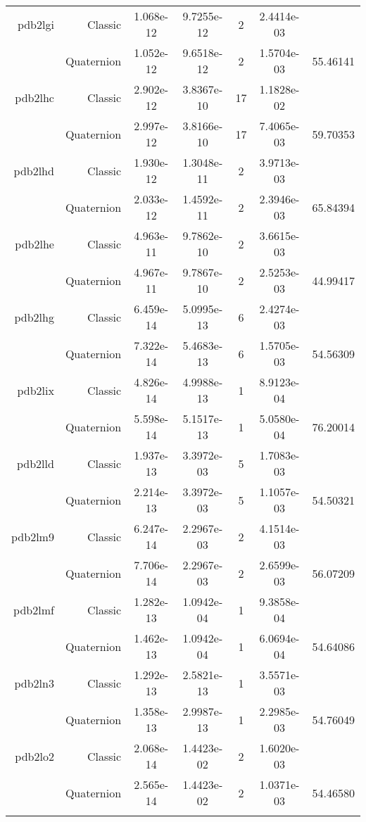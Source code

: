 \begin{xltabular}{\textwidth}{r|rS[table-format=1.3e+2]S[table-format=1.4e+2]cS[table-format=1.4e+2]S[table-format=-1.5]}
pdb2lgi & Classic & 1.068e-12 & 9.7255e-12 & 2 & 2.4414e-03 & \\
& Quaternion & 1.052e-12 & 9.6518e-12 & 2 & 1.5704e-03 & 55.46141\\  \addlinespace
pdb2lhc & Classic & 2.902e-12 & 3.8367e-10 & 17 & 1.1828e-02 & \\
& Quaternion & 2.997e-12 & 3.8166e-10 & 17 & 7.4065e-03 & 59.70353\\  \addlinespace
pdb2lhd & Classic & 1.930e-12 & 1.3048e-11 & 2 & 3.9713e-03 & \\
& Quaternion & 2.033e-12 & 1.4592e-11 & 2 & 2.3946e-03 & 65.84394\\  \addlinespace
pdb2lhe & Classic & 4.963e-11 & 9.7862e-10 & 2 & 3.6615e-03 & \\
& Quaternion & 4.967e-11 & 9.7867e-10 & 2 & 2.5253e-03 & 44.99417\\  \addlinespace
pdb2lhg & Classic & 6.459e-14 & 5.0995e-13 & 6 & 2.4274e-03 & \\
& Quaternion & 7.322e-14 & 5.4683e-13 & 6 & 1.5705e-03 & 54.56309\\  \addlinespace
pdb2lix & Classic & 4.826e-14 & 4.9988e-13 & 1 & 8.9123e-04 & \\
& Quaternion & 5.598e-14 & 5.1517e-13 & 1 & 5.0580e-04 & 76.20014\\  \addlinespace
pdb2lld & Classic & 1.937e-13 & 3.3972e-03 & 5 & 1.7083e-03 & \\
& Quaternion & 2.214e-13 & 3.3972e-03 & 5 & 1.1057e-03 & 54.50321\\  \addlinespace
pdb2lm9 & Classic & 6.247e-14 & 2.2967e-03 & 2 & 4.1514e-03 & \\
& Quaternion & 7.706e-14 & 2.2967e-03 & 2 & 2.6599e-03 & 56.07209\\  \addlinespace
pdb2lmf & Classic & 1.282e-13 & 1.0942e-04 & 1 & 9.3858e-04 & \\
& Quaternion & 1.462e-13 & 1.0942e-04 & 1 & 6.0694e-04 & 54.64086\\  \addlinespace
pdb2ln3 & Classic & 1.292e-13 & 2.5821e-13 & 1 & 3.5571e-03 & \\
& Quaternion & 1.358e-13 & 2.9987e-13 & 1 & 2.2985e-03 & 54.76049\\  \addlinespace
pdb2lo2 & Classic & 2.068e-14 & 1.4423e-02 & 2 & 1.6020e-03 & \\
& Quaternion & 2.565e-14 & 1.4423e-02 & 2 & 1.0371e-03 & 54.46580\\  \addlinespace

\end{xltabular}
